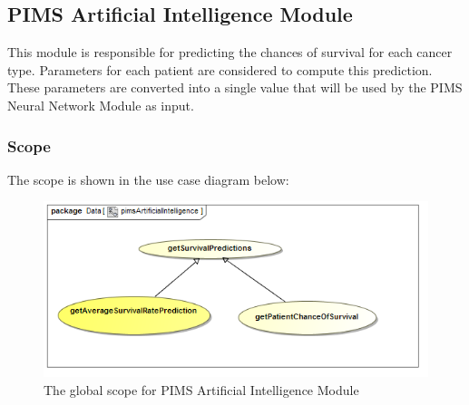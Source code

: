 \subsection{PIMS Artificial Intelligence Module}
This module is responsible for predicting the chances of survival for each cancer type. Parameters for each patient are considered to compute this prediction. These parameters are converted into a single value that will be used by the PIMS Neural Network Module as input. \par 

\subsubsection{Scope}
The scope is shown in the use case diagram below: \par
\begin{figure}[H]
\centerline{\includegraphics[width=0.75\linewidth]{./Functional_Requirements/Graphics/pimsAI/pimsArtificialIntelligence}}
\caption{The global scope for PIMS Artificial Intelligence Module}
\end{figure}

